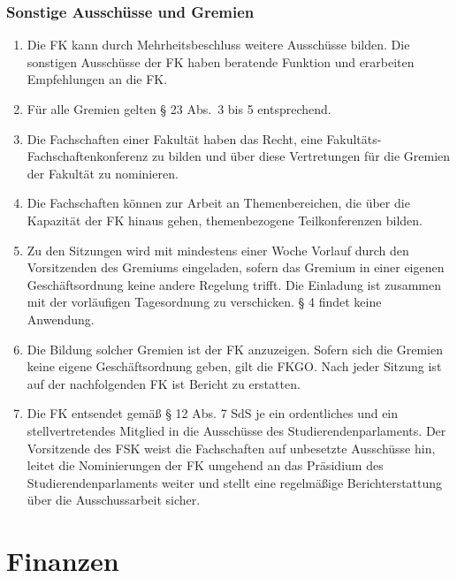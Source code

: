 \documentclass{article}
\begin{document}
\section{Sonstige Ausschüsse und Gremien}
\begin{enumerate}[(1)]
    \item Die FK kann durch Mehrheitsbeschluss weitere Ausschüsse bilden. 
    	Die sonstigen Ausschüsse der FK haben beratende Funktion und erarbeiten Empfehlungen an die FK. 
    \item Für alle Gremien gelten § 23 Abs.\ 3 bis 5 entsprechend.
    \item Die Fachschaften einer Fakultät haben das Recht, eine Fakultäts-Fachschaftenkonferenz zu bilden und über diese Vertretungen für die Gremien der Fakultät zu nominieren. 
    \item Die Fachschaften können zur Arbeit an Themenbereichen, die über die Kapazität der FK hinaus gehen, themenbezogene Teilkonferenzen bilden. 
    \item Zu den Sitzungen wird mit mindestens einer Woche Vorlauf durch den Vorsitzenden des Gremiums eingeladen, sofern das Gremium in einer eigenen Geschäftsordnung keine andere Regelung trifft. 
    	Die Einladung ist zusammen mit der vorläufigen Tagesordnung zu verschicken. 
    	§ 4 findet keine Anwendung.
    \item Die Bildung solcher Gremien ist der FK anzuzeigen. 
    	Sofern sich die Gremien keine eigene Geschäftsordnung geben, gilt die FKGO. 
    	Nach jeder Sitzung ist auf der nachfolgenden FK ist Bericht zu erstatten.
    \item Die FK entsendet gemäß § 12 Abs. 7 SdS je ein ordentliches und ein stellvertretendes Mitglied in die Ausschüsse des Studierendenparlaments. 
    	Der Vorsitzende des FSK weist die Fachschaften auf unbesetzte Ausschüsse hin, leitet die Nominierungen der FK umgehend an das Präsidium des Studierendenparlaments weiter und stellt eine regelmäßige Berichterstattung über die Ausschussarbeit sicher.
\end{enumerate}

\part{Finanzen}
\end{document}
